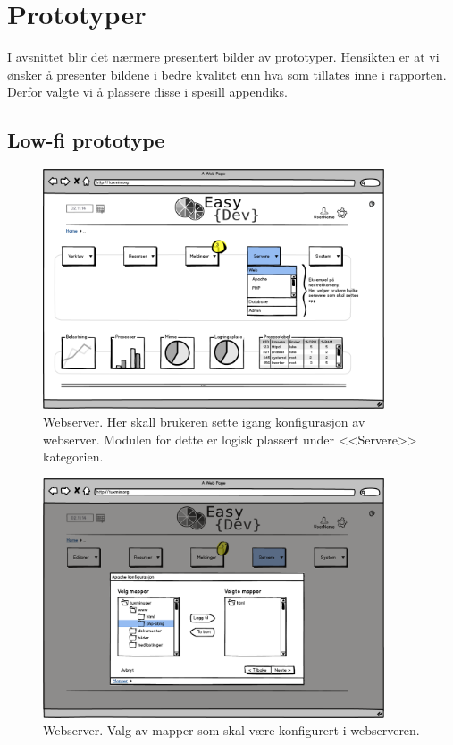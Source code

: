\chapter{Prototyper}
I avsnittet blir det nærmere presentert bilder av prototyper. Hensikten er at vi ønsker å presenter bildene i bedre kvalitet enn hva som tillates inne i rapporten. Derfor valgte vi å plassere disse i spesill appendiks.
\section{Low-fi prototype} \label{sec:appendiksLowFi}
\newcommand{\lowB}{0.9}
\begin{figure}[ht]
\centering
\includegraphics[width=\lowB\textwidth,height=\textheight,keepaspectratio]
{./img/prosessdokumentasjon/lowfi/apache1.png}
\caption[Low-fi Webserver 1]{Webserver. Her skall brukeren sette igang konfigurasjon av webserver. Modulen for dette er logisk plassert under <<Servere>> kategorien.}
\label{fig:apachelow1}
\end{figure}

\begin{figure}[ht]
\centering
\includegraphics[width=\lowB\textwidth,height=\textheight,keepaspectratio]{./img/prosessdokumentasjon/lowfi/apache2.png}
\caption[Low-fi Webserver 2]{Webserver. Valg av mapper som skal være konfigurert i webserveren.}
\label{fig:apachelow2}
\end{figure}

